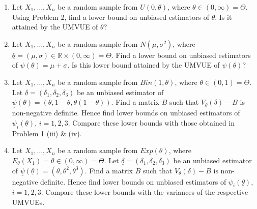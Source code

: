 \documentclass[12pt]{article}
\begin{document}
\begin{enumerate}
    \item Let $X_{1}, \dots, X_{n}$ be a random sample from $U(0, \theta)$, where $\theta \in (0, \infty) = \Theta$. Using Problem 2, find a lower bound on unbiased estimators of $\theta$. Is it attained by the UMVUE of $\theta$?

    \item Let $X_{1}, \dots, X_{n}$ be a random sample from $N(\mu, \sigma^{2})$, where $\underline{\theta} = (\mu, \sigma) \in \mathbb{R} \times (0, \infty) = \Theta$. Find a lower bound on unbiased estimators of $\psi(\underline{\theta}) = \mu + \sigma$. Is this lower bound attained by the UMVUE of $\psi(\underline{\theta})$?

    \item Let $X_{1}, \dots, X_{n}$ be a random sample from $Bin(1, \theta)$, where $\theta \in (0, 1) = \Theta$. Let $\underline{\delta} = (\delta_{1}, \delta_{2}, \delta_{3})$ be an unbiased estimator of $\underline{\psi}(\underline{\theta}) = (\theta, 1 - \theta, \theta(1 - \theta))$. Find a matrix $B$ such that $V_{\theta}(\delta) - B$ is non-negative definite. Hence find lower bounds on unbiased estimators of $\psi_{i}(\underline{\theta})$, $i = 1, 2, 3$. Compare these lower bounds with those obtained in Problem 1 (iii) \& (iv).

    \item Let $X_{1}, \dots, X_{n}$ be a random sample from $Exp(\theta)$, where $E_{\theta}(X_{1}) = \theta \in (0, \infty) = \Theta$. Let $\underline{\delta} = (\delta_{1}, \delta_{2}, \delta_{3})$ be an unbiased estimator of $\underline{\psi}(\underline{\theta}) = (\theta, \theta^{2}, \theta^{3})$. Find a matrix $B$ such that $V_{\theta}(\delta) - B$ is non-negative definite. Hence find lower bounds on unbiased estimators of $\psi_{i}(\underline{\theta})$, $i = 1, 2, 3$. Compare these lower bounds with the variances of the respective UMVUEs.
\end{enumerate}
\end{document}
